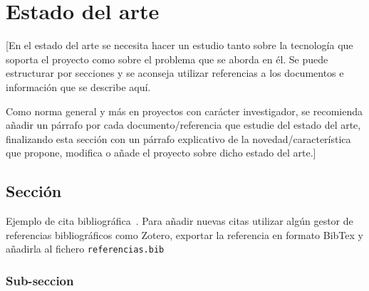 \chapter{Estado del arte}\label{cap:estado_del_arte}
[En el estado del arte se necesita hacer un estudio tanto sobre la tecnología que soporta el proyecto como sobre el problema que se aborda en él. Se puede estructurar por secciones y se aconseja utilizar referencias a los documentos e información que se describe aquí. 

Como norma general y más en proyectos con carácter investigador, se recomienda añadir un párrafo por cada documento/referencia que estudie del estado del arte, finalizando esta sección con un párrafo explicativo de la novedad/característica que propone, modifica o añade el proyecto sobre dicho estado del arte.]

\section{Sección}\label{sec:seccion}
Ejemplo de cita bibliográfica~\cite{leo_federated_2014}. Para añadir nuevas citas utilizar algún gestor de referencias bibliográficos como Zotero, exportar la referencia en formato BibTex y añadirla al fichero \texttt{referencias.bib}



\subsection{Sub-seccion}\label{sec:subsection}

